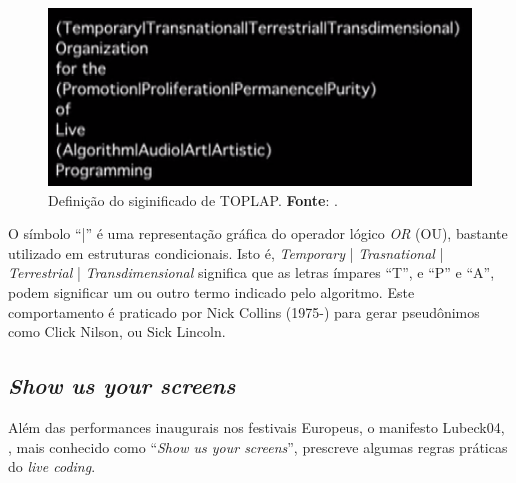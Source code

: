 \begin{figure}[!h]
  \centering
  \includegraphics[scale=0.8]{imagens/TOPLAP.png}
  \caption{Definição do siginificado de TOPLAP. \textbf{Fonte}: .}
  \label{fig:TOPLAP}
\end{figure}

O símbolo ``|'' é uma representação gráfica do operador lógico \emph{OR} (OU), bastante utilizado em estruturas condicionais. Isto é, \emph{Temporary }| \emph{Trasnational} | \emph{Terrestrial} | \emph{Transdimensional} significa que as letras ímpares ``T'', e ``P'' e ``A'', podem significar um ou outro termo indicado pelo algoritmo. Este comportamento é praticado por Nick Collins (1975-) para gerar pseudônimos como Click Nilson, ou Sick Lincoln. 

\subsection{\emph{Show us your screens}}\label{sec:showusyourscreens}

Além das performances inaugurais nos festivais Europeus, o manifesto Lubeck04, , mais conhecido como ``\emph{Show us your screens}'', prescreve algumas regras práticas do \emph{live coding}. 

